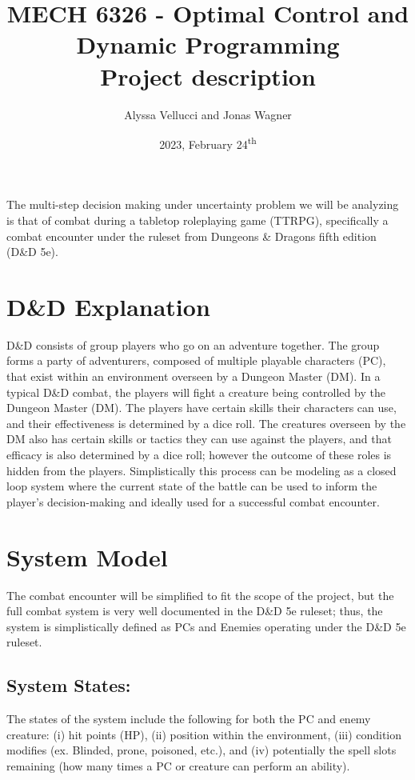 \documentclass[9pt]{article}
\title{
    MECH 6326 - Optimal Control and Dynamic Programming \\ 
    Project description
}
\author{Alyssa Vellucci and Jonas Wagner}
\date{2023, February 24\textsuperscript{th}}
\begin{document}
\maketitle


The multi-step decision making under uncertainty problem we will be analyzing is that of combat during a tabletop roleplaying game (TTRPG), specifically a combat encounter under the ruleset from Dungeons \& Dragons fifth edition (D\&D 5e).

\section*{D\&D Explanation}
D\&D consists of group players who go on an adventure together.
The group forms a party of adventurers, composed of multiple playable characters (PC), that exist within an environment overseen by a Dungeon Master (DM).
In a typical D\&D combat, the players will fight a creature being controlled by the Dungeon Master (DM). 
The players have certain skills their characters can use, and their effectiveness is determined by a dice roll. 
The creatures overseen by the DM also has certain skills or tactics they can use against the players, and that efficacy is also determined by a dice roll; however the outcome of these roles is hidden from the players. 
Simplistically this process can be modeling as a closed loop system where the current state of the battle can be used to inform the player’s decision-making and ideally used for a successful combat encounter.

\section*{System Model}
The combat encounter will be simplified to fit the scope of the project, but the full combat system is very well documented in the D\&D 5e ruleset; thus, the system is simplistically defined as PCs and Enemies operating under the D\&D 5e ruleset.

\subsection*{System States:}
The states of the system include the following for both the PC and enemy creature: 
(i) hit points (HP), 
(ii) position within the environment, 
(iii) condition modifies (ex. Blinded, prone, poisoned, etc.),
and (iv) potentially the spell slots remaining (how many times a PC or creature can perform an ability).
\end{document}
